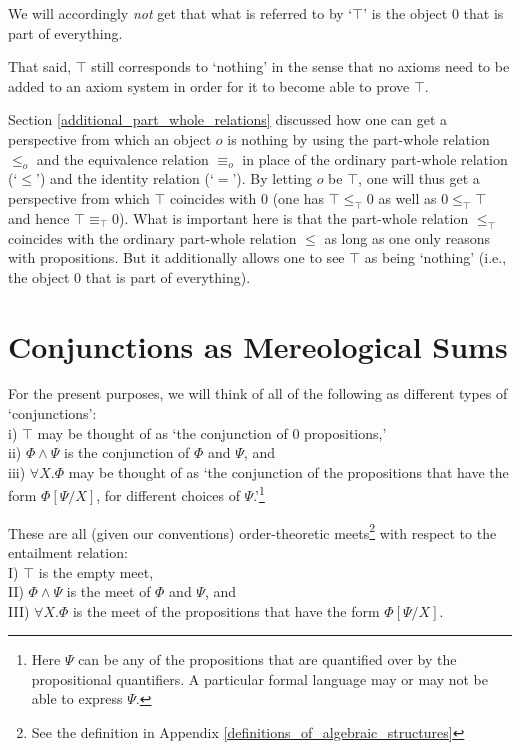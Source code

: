 \documentclass[12pt]{book}
\begin{document}
We will accordingly \textit{not} get that what is referred to by `$\top$' is the object 0 that is part of everything. 

That said, $\top$ still corresponds to `nothing' in the sense that no axioms need to be added to an axiom system in order for it to become able to prove $\top$.

Section \ref{additional_part_whole_relations} discussed how one can get a perspective from which an object $o$ is nothing by using the part-whole relation $\le_o$ and the equivalence relation $\equiv_o$ in place of the ordinary part-whole relation (`$\le$') and the identity relation (`$=$'). By letting $o$ be $\top$, one will thus get a perspective from which $\top$ coincides with $0$ (one has $\top \le_\top 0$ as well as $0 \le_\top \top$ and hence $\top \equiv_\top 0$). What is important here is that the part-whole relation $\le_\top$ coincides with the ordinary part-whole relation $\le$ as long as one only reasons with propositions. But it additionally allows one to see $\top$ as being `nothing' (i.e., the object $0$ that is part of everything).

\section{Conjunctions as Mereological Sums} \label{conjunctions_as_mereological_sums}
For the present purposes, we will think of all of the following as different types of `conjunctions':\\
i) $\top$ may be thought of as `the conjunction of 0 propositions,'\\
ii) $\Phi \wedge \Psi$ is the conjunction of $\Phi$ and $\Psi$, and\\
iii) $\forall X.\Phi$ may be thought of as `the conjunction of the propositions that have the form $\Phi[\Psi/X]$, for different choices of $\Psi$.'\footnote{Here $\Psi$ can be any of the propositions that are quantified over by the propositional quantifiers. A particular formal language may or may not be able to express $\Psi$.}

These are all (given our conventions) order-theoretic meets\footnote{See the definition in Appendix \ref{definitions_of_algebraic_structures}} with respect to the entailment relation:\\
I) $\top$ is the empty meet,\\
II) $\Phi \wedge \Psi$ is the meet of $\Phi$ and $\Psi$, and\\
III) $\forall X.\Phi$ is the meet of the propositions that have the form $\Phi[\Psi/X]$.
\end{document}
